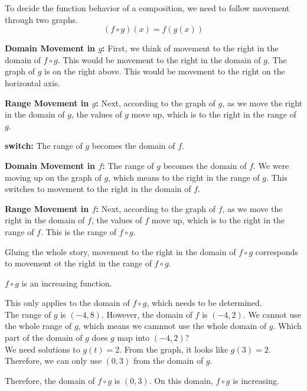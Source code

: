 \documentclass{ximera}
\begin{document}
To decide the function behavior of a composition, we need to follow movement through two graphs. \\



\[
(f \circ g)(x) = f(g(x))
\]



\textbf{\textcolor{blue!55!black}{Domain Movement in $g$:}}  First, we think of movement to the right in the domain of $f \circ g$.  This would be movement to the right in the domain of $g$.  The graph of $g$ is on the right above.  This would be movement to the right on the horizontal axis.



\textbf{\textcolor{blue!55!black}{Range Movement in $g$:}}  Next, according to the graph of $g$, as we move the right in the domain of $g$, the values of $g$ move up, which is to the right in the range of $g$.




\textbf{\textcolor{blue!55!black}{switch:}}   The range of $g$ becomes the domain of $f$.  


\textbf{\textcolor{blue!55!black}{Domain Movement in $f$:}}   The range of $g$ becomes the domain of $f$.  We were moving up on the graph of $g$, which means to the right in the range of $g$.  This switches to movement to the right in the domain of $f$.


\textbf{\textcolor{blue!55!black}{Range Movement in $f$:}}  Next, according to the graph of $f$, as we move the right in the domain of $f$, the values of $f$ move up, which is to the right in the range of $f$.  This is the range of $f \circ g$.




Gluing the whole story, movement to the right in the domain of $f \circ g$ corresponds to movement ot the right in the range of $f \circ g$.

$f \circ g$ is an increasing function.



\begin{observation}


This only applies to the domain of $f \circ g$, which needs to be determined. \\



The range of $g$ is $(-4, 8)$.  However, the domain of $f$ is $(-4, 2)$.   We cannot use the whole range of $g$, which means we camnnot use the whole domain of $g$.  Which part of the domain of $g$ does $g$ map into $(-4, 2)$? \\


We need solutions to $g(t) = 2$.  From the graph, it looks like $g(3) = 2$.  Therefore, we can only use $(0, 3)$ from the domain of $g$.


Therefore, the domain of $f \circ g$ is $(0, 3)$.  On this domain, $f \circ g$ is increasing.



\end{observation}
\end{document}
